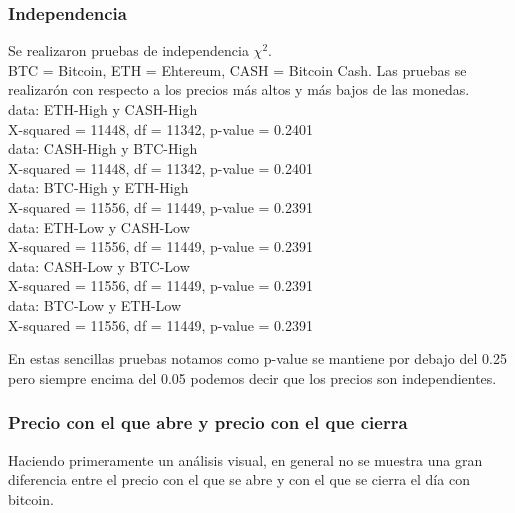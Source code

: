 \documentclass[12pt,letterpaper]{article}
\begin{document}
\subsubsection*{Independencia}
Se realizaron pruebas de independencia $\chi^{2}$.
\\
BTC = Bitcoin, ETH = Ehtereum, CASH = Bitcoin Cash. Las pruebas se realizar\'on con respecto a los precios m\'as altos y m\'as bajos de las monedas.
\\

data:  ETH-High y CASH-High\\
X-squared = 11448, df = 11342, p-value = 0.2401
\\

data:  CASH-High y BTC-High\\
X-squared = 11448, df = 11342, p-value = 0.2401
\\

data:	BTC-High y ETH-High\\
X-squared = 11556, df = 11449, p-value = 0.2391
\\

data:  ETH-Low y CASH-Low\\
X-squared = 11556, df = 11449, p-value = 0.2391
\\

data:  CASH-Low y BTC-Low\\
X-squared = 11556, df = 11449, p-value = 0.2391
\\

data:  BTC-Low y ETH-Low\\
X-squared = 11556, df = 11449, p-value = 0.2391

En estas sencillas pruebas notamos como p-value se mantiene por debajo del 0.25 pero siempre encima del 0.05 podemos decir que los precios son independientes.

    \subsubsection*{Precio con el que abre y precio con el que cierra}

    Haciendo primeramente un an\'alisis visual, en general no se muestra una gran diferencia entre el precio con el que se abre y con el que se cierra el día con bitcoin.
    \\
    
\end{document}
